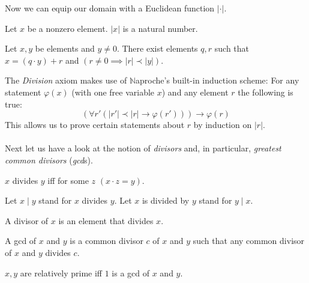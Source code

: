 \documentclass[english]{article}
\begin{document}
  Now we can equip our domain with a Euclidean function $|\cdot|$.

  \begin{forthel}
    \begin{signature}\label{EucSort}
      Let $x$ be a nonzero element. $|x|$ is a natural number.
    \end{signature}

    \begin{axiom}\label{Division}
      Let $x,y$ be elements and $y \neq 0$.
      There exist elements $q,r$ such that $x = (q \cdot y) + r$ and
      $(r \neq 0 \implies |r| \prec |y|)$.
    \end{axiom}
  \end{forthel}

  The \textit{Division} axiom makes use of {$\mathbb{N}$aproche's} built-in
  induction scheme: For any statement $\varphi(x)$ (with one free variable $x$)
  and any element $r$ the following is true:
  \[ (\forall r' (|r'| \prec |r| \rightarrow \varphi(r'))) \rightarrow \varphi(r) \]
  This allows us to prove certain statements about $r$ by induction on $|r|$.

  \paragraph{} Next let us have a look at the notion of \textit{divisors} and,
  in particular, \textit{greatest common divisors} (\textit{gcd}s).

  \begin{forthel}
    \begin{definition}\label{DefDiv}
      $x$ divides $y$ iff for some $z$ $(x \cdot z = y)$.
    \end{definition}

    Let $x \mid y$ stand for $x$ divides $y$.
    Let $x$ is divided by $y$ stand for $y \mid x$.

    \begin{definition}\label{DefDvs}
      A divisor of $x$ is an element that divides $x$.
    \end{definition}

    \begin{definition}\label{DefGCD}
      A gcd of $x$ and $y$ is a common divisor $c$ of $x$ and $y$ such that any
      common divisor of $x$ and $y$ divides $c$.
    \end{definition}

    \begin{definition}\label{DefRel}
      $x,y$ are relatively prime iff $1$ is a gcd of $x$ and $y$.
    \end{definition}
  \end{forthel}
\end{document}
